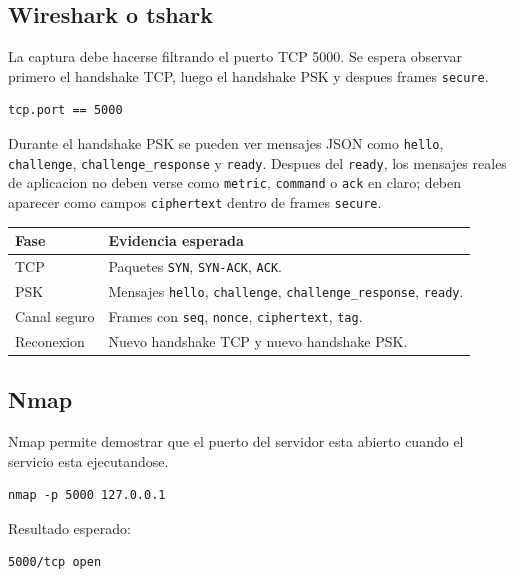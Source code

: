 \documentclass[11pt,letterpaper]{article}
\begin{document}
\subsection{Wireshark o tshark}

La captura debe hacerse filtrando el puerto TCP 5000. Se espera observar primero
el handshake TCP, luego el handshake PSK y despues frames \texttt{secure}.

\begin{lstlisting}[style=terminal]
tcp.port == 5000
\end{lstlisting}

Durante el handshake PSK se pueden ver mensajes JSON como \texttt{hello},
\texttt{challenge}, \texttt{challenge\_response} y \texttt{ready}. Despues del
\texttt{ready}, los mensajes reales de aplicacion no deben verse como
\texttt{metric}, \texttt{command} o \texttt{ack} en claro; deben aparecer como
campos \texttt{ciphertext} dentro de frames \texttt{secure}.

\begin{longtable}{|p{}|p{}|}
\hline
\textbf{Fase} & \textbf{Evidencia esperada} \\
\hline
TCP & Paquetes \texttt{SYN}, \texttt{SYN-ACK}, \texttt{ACK}. \\
\hline
PSK & Mensajes \texttt{hello}, \texttt{challenge}, \texttt{challenge\_response}, \texttt{ready}. \\
\hline
Canal seguro & Frames con \texttt{seq}, \texttt{nonce}, \texttt{ciphertext}, \texttt{tag}. \\
\hline
Reconexion & Nuevo handshake TCP y nuevo handshake PSK. \\
\hline
\end{longtable}

\subsection{Nmap}

Nmap permite demostrar que el puerto del servidor esta abierto cuando el servicio
esta ejecutandose.

\begin{lstlisting}[style=terminal]
nmap -p 5000 127.0.0.1
\end{lstlisting}

Resultado esperado:

\begin{lstlisting}[style=terminal]
5000/tcp open
\end{lstlisting}
\end{document}
